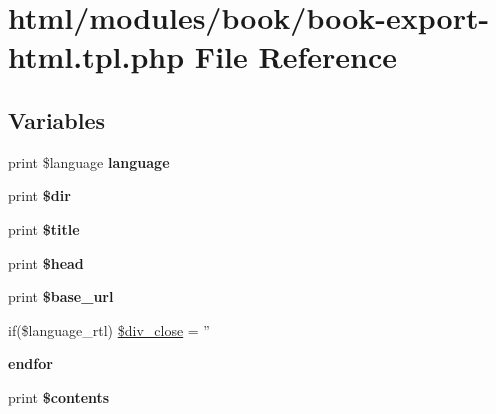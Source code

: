 \hypertarget{book-export-html_8tpl_8php}{
\section{html/modules/book/book-\/export-\/html.tpl.php File Reference}
\label{book-export-html_8tpl_8php}
}
\subsection*{Variables}
\begin{DoxyCompactItemize}
\item 
\hypertarget{book-export-html_8tpl_8php_a42cd582c44c919666b05626f0b2a39d3}{
print \$language {\bfseries language}}
\label{book-export-html_8tpl_8php_a42cd582c44c919666b05626f0b2a39d3}

\item 
\hypertarget{book-export-html_8tpl_8php_a8a856aae7da1699f906806c6165d264f}{
print {\bfseries \$dir}}
\label{book-export-html_8tpl_8php_a8a856aae7da1699f906806c6165d264f}

\item 
\hypertarget{book-export-html_8tpl_8php_aec2795512d255332f57cacd930a090b4}{
print {\bfseries \$title}}
\label{book-export-html_8tpl_8php_aec2795512d255332f57cacd930a090b4}

\item 
\hypertarget{book-export-html_8tpl_8php_a2758cd2886f39b56c05b61ab6cec7a5d}{
print {\bfseries \$head}}
\label{book-export-html_8tpl_8php_a2758cd2886f39b56c05b61ab6cec7a5d}

\item 
\hypertarget{book-export-html_8tpl_8php_a73af004a34e36e5a0d7c577096a9d84b}{
print {\bfseries \$base\_\-url}}
\label{book-export-html_8tpl_8php_a73af004a34e36e5a0d7c577096a9d84b}

\item 
if(\$language\_\-rtl) \hyperlink{book-export-html_8tpl_8php_ad7ca5cbbe327a2d37bf5ac15dc38efe0}{\$div\_\-close} = ''
\item 
\hypertarget{book-export-html_8tpl_8php_ae8fdc27183f296411bac00ed522ee1ac}{
{\bfseries endfor}}
\label{book-export-html_8tpl_8php_ae8fdc27183f296411bac00ed522ee1ac}

\item 
\hypertarget{book-export-html_8tpl_8php_ae5669c449da191330771ceda05435811}{
print {\bfseries \$contents}}
\label{book-export-html_8tpl_8php_ae5669c449da191330771ceda05435811}

\end{DoxyCompactItemize}


